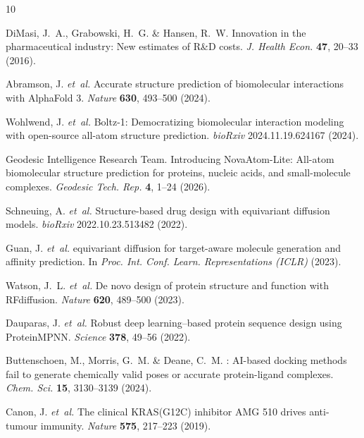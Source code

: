 \documentclass[11pt,a4paper]{article}
\begin{document}
\begin{thebibliography}{10}

DiMasi, J.~A., Grabowski, H.~G. \& Hansen, R.~W.
\newblock Innovation in the pharmaceutical industry: New estimates of R\&D costs.
\newblock \emph{J. Health Econ.} \textbf{47}, 20--33 (2016).

Abramson, J. \emph{et~al.}
\newblock Accurate structure prediction of biomolecular interactions with {AlphaFold} 3.
\newblock \emph{Nature} \textbf{630}, 493--500 (2024).

Wohlwend, J. \emph{et~al.}
\newblock Boltz-1: Democratizing biomolecular interaction modeling with open-source all-atom structure prediction.
\newblock \emph{bioRxiv} 2024.11.19.624167 (2024).

{Geodesic Intelligence Research Team}.
\newblock Introducing {NovaAtom-Lite}: All-atom biomolecular structure prediction for proteins, nucleic acids, and small-molecule complexes.
\newblock \emph{Geodesic Tech. Rep.} \textbf{4}, 1--24 (2026).

Schneuing, A. \emph{et~al.}
\newblock Structure-based drug design with equivariant diffusion models.
\newblock \emph{bioRxiv} 2022.10.23.513482 (2022).

Guan, J. \emph{et~al.}
 equivariant diffusion for target-aware molecule generation and affinity prediction.
\newblock In \emph{Proc. Int. Conf. Learn. Representations (ICLR)} (2023).

Watson, J.~L. \emph{et~al.}
\newblock De novo design of protein structure and function with {RFdiffusion}.
\newblock \emph{Nature} \textbf{620}, 489--500 (2023).

Dauparas, J. \emph{et~al.}
\newblock Robust deep learning--based protein sequence design using {ProteinMPNN}.
\newblock \emph{Science} \textbf{378}, 49--56 (2022).

Buttenschoen, M., Morris, G.~M. \& Deane, C.~M.
: AI-based docking methods fail to generate chemically valid poses or accurate protein-ligand complexes.
\newblock \emph{Chem. Sci.} \textbf{15}, 3130--3139 (2024).

Canon, J. \emph{et~al.}
\newblock The clinical {KRAS(G12C)} inhibitor {AMG 510} drives anti-tumour immunity.
\newblock \emph{Nature} \textbf{575}, 217--223 (2019).


\end{thebibliography}
\end{document}
